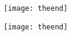  
\makeatletter
{}
{%
	\enlargethispage{\baselineskip} 
	\centering
	\texttt{[image: theend]}
	\thispagestyle{headings}

}{%
	\centering
	\texttt{[image: theend]}
	\thispagestyle{headings}
}

\makeatother
   